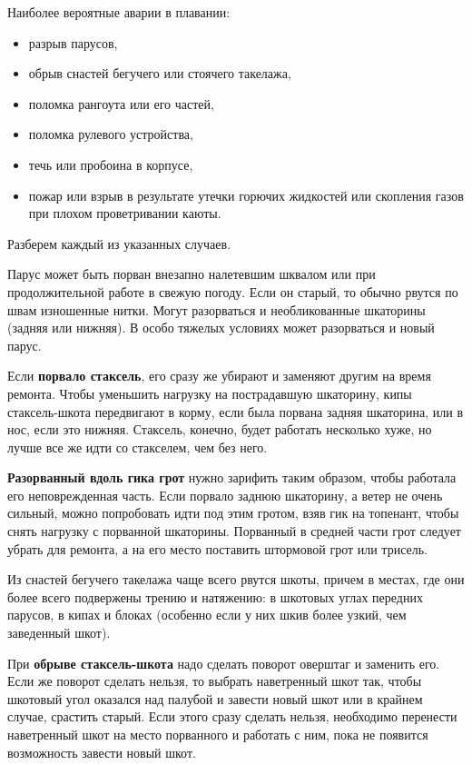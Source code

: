\documentclass[a4paper, 12pt, twoside, final]{scrbook}
\begin{document}
Наиболее вероятные аварии в плавании:

\begin{itemize}
\item разрыв парусов,
\item обрыв снастей бегучего или стоячего такелажа,
\item поломка рангоута или его частей,
\item поломка рулевого устройства,
\item течь или пробоина в корпусе,
\item пожар или взрыв в результате утечки горючих жидкостей или скопления газов при плохом проветривании каюты.
\end{itemize}

Разберем каждый из указанных случаев.

Парус может быть порван внезапно налетевшим шквалом или при продолжительной работе в свежую погоду. Если он старый, то обычно рвутся по швам изношенные нитки. Могут разорваться и необликованные шкаторины (задняя или нижняя). В особо тяжелых условиях может разорваться и новый парус.

Если \textbf{порвало стаксель}, его сразу же убирают и заменяют другим на время ремонта. Чтобы уменьшить нагрузку на пострадавшую шкаторину, кипы стаксель-шкота передвигают в корму, если была порвана задняя шкаторина, или в нос, если это нижняя. Стаксель, конечно, будет работать несколько хуже, но лучше все же идти со стакселем, чем без него.

\textbf{Разорванный вдоль гика грот} нужно зарифить таким образом, чтобы работала его неповрежденная часть. Если порвало заднюю шкаторину, а ветер не очень сильный, можно попробовать идти под этим гротом, взяв гик на топенант, чтобы снять нагрузку с порванной шкаторины. Порванный в средней части грот следует убрать для ремонта, а на его место поставить штормовой грот или трисель.

Из снастей бегучего такелажа чаще всего рвутся шкоты, причем в местах, где они более всего подвержены трению и натяжению: в шкотовых углах передних парусов, в кипах и блоках (особенно если у них шкив более узкий, чем заведенный шкот).

При \textbf{обрыве стаксель-шкота} надо сделать поворот оверштаг и заменить его. Если же поворот сделать нельзя, то выбрать наветренный шкот так, чтобы шкотовый угол оказался над палубой и завести новый шкот или в крайнем случае, срастить старый. Если этого сразу сделать нельзя, необходимо перенести наветренный шкот на место порванного и работать с ним, пока не появится возможность завести новый шкот.
\end{document}
